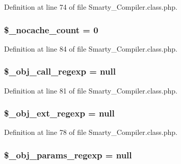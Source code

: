 \-Definition at line 74 of file \-Smarty\-\_\-\-Compiler.\-class.\-php.

\hypertarget{class_smarty___compiler_a0f09779c61d76f5cffe8bfe5ce4dfd72}{
\subsubsection[{\$\-\_\-nocache\-\_\-count}]{\setlength{\rightskip}{0pt plus 5cm}\$\-\_\-nocache\-\_\-count = 0}}\label{class_smarty___compiler_a0f09779c61d76f5cffe8bfe5ce4dfd72}


\-Definition at line 84 of file \-Smarty\-\_\-\-Compiler.\-class.\-php.

\hypertarget{class_smarty___compiler_a05e5d29068b0595c0f11a067f08b2538}{
\subsubsection[{\$\-\_\-obj\-\_\-call\-\_\-regexp}]{\setlength{\rightskip}{0pt plus 5cm}\$\-\_\-obj\-\_\-call\-\_\-regexp = null}}\label{class_smarty___compiler_a05e5d29068b0595c0f11a067f08b2538}


\-Definition at line 81 of file \-Smarty\-\_\-\-Compiler.\-class.\-php.

\hypertarget{class_smarty___compiler_a2930f1656f4528a9490a12be7e14ac8d}{
\subsubsection[{\$\-\_\-obj\-\_\-ext\-\_\-regexp}]{\setlength{\rightskip}{0pt plus 5cm}\$\-\_\-obj\-\_\-ext\-\_\-regexp = null}}\label{class_smarty___compiler_a2930f1656f4528a9490a12be7e14ac8d}


\-Definition at line 78 of file \-Smarty\-\_\-\-Compiler.\-class.\-php.

\hypertarget{class_smarty___compiler_af75c377154fc8525710f50c18afd5685}{
\subsubsection[{\$\-\_\-obj\-\_\-params\-\_\-regexp}]{\setlength{\rightskip}{0pt plus 5cm}\$\-\_\-obj\-\_\-params\-\_\-regexp = null}}\label{class_smarty___compiler_af75c377154fc8525710f50c18afd5685}


